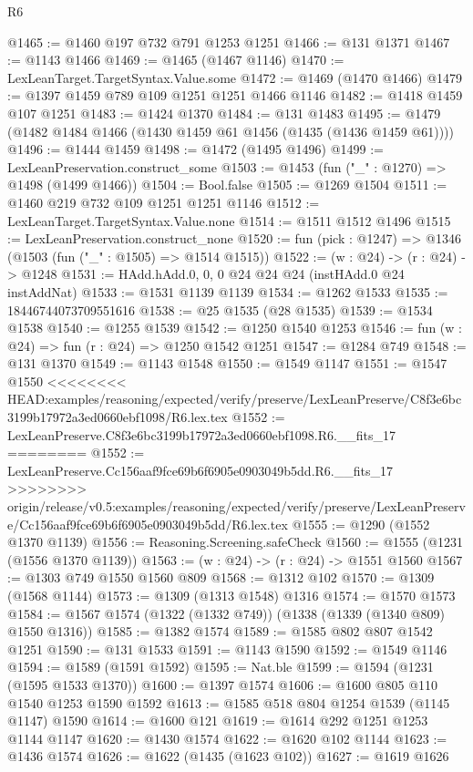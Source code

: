 \begin{lexlean}{R6}
\begin{coremodule}
{{{{{{{{{{{{{{{{{{{{{{{{{{{{{{{{{{{{{{{{{{{{{{{{{{{{{{{{{{{{{@1465 := @1460 @197 @732 @791 @1253 @1251
@1466 := @131 @1371
@1467 := @1143 @1466
@1469 := @1465 (@1467 @1146)
@1470 := LexLeanTarget.TargetSyntax.Value.some
@1472 := @1469 (@1470 @1466)
@1479 := @1397 @1459 @789 @109 @1251 @1251 @1466 @1146
@1482 := @1418 @1459 @107 @1251
@1483 := @1424 @1370
@1484 := @131 @1483
@1495 := @1479 (@1482 @1484 @1466 (@1430 @1459 @61 @1456 (@1435 (@1436 @1459 @61))))
@1496 := @1444 @1459
@1498 := @1472 (@1495 @1496)
@1499 := LexLeanPreservation.construct_some
@1503 := @1453 (fun ("_" : @1270) => @1498 (@1499 @1466))
@1504 := Bool.false
@1505 := @1269 @1504
@1511 := @1460 @219 @732 @109 @1251 @1251 @1146
@1512 := LexLeanTarget.TargetSyntax.Value.none
@1514 := @1511 @1512 @1496
@1515 := LexLeanPreservation.construct_none
@1520 := fun (pick : @1247) => @1346 (@1503 (fun ("_" : @1505) => @1514 @1515))
@1522 := (w : @24) -> (r : @24) -> @1248
@1531 := HAdd.hAdd.{0, 0, 0} @24 @24 @24 (instHAdd.{0} @24 instAddNat)
@1533 := @1531 @1139 @1139
@1534 := @1262 @1533
@1535 := 18446744073709551616
@1538 := @25 @1535 (@28 @1535)
@1539 := @1534 @1538
@1540 := @1255 @1539
@1542 := @1250 @1540 @1253
@1546 := fun (w : @24) => fun (r : @24) => @1250 @1542 @1251
@1547 := @1284 @749
@1548 := @131 @1370
@1549 := @1143 @1548
@1550 := @1549 @1147
@1551 := @1547 @1550
<<<<<<<< HEAD:examples/reasoning/expected/verify/preserve/LexLeanPreserve/C8f3e6bc3199b17972a3ed0660ebf1098/R6.lex.tex
@1552 := LexLeanPreserve.C8f3e6bc3199b17972a3ed0660ebf1098.R6.__fits_17
========
@1552 := LexLeanPreserve.Cc156aaf9fce69b6f6905e0903049b5dd.R6.__fits_17
>>>>>>>> origin/release/v0.5:examples/reasoning/expected/verify/preserve/LexLeanPreserve/Cc156aaf9fce69b6f6905e0903049b5dd/R6.lex.tex
@1555 := @1290 (@1552 @1370 @1139)
@1556 := Reasoning.Screening.safeCheck
@1560 := @1555 (@1231 (@1556 @1370 @1139))
@1563 := (w : @24) -> (r : @24) -> @1551 @1560
@1567 := @1303 @749 @1550 @1560 @809
@1568 := @1312 @102
@1570 := @1309 (@1568 @1144)
@1573 := @1309 (@1313 @1548) @1316
@1574 := @1570 @1573
@1584 := @1567 @1574 (@1322 (@1332 @749)) (@1338 (@1339 (@1340 @809) @1550 @1316))
@1585 := @1382 @1574
@1589 := @1585 @802 @807 @1542 @1251
@1590 := @131 @1533
@1591 := @1143 @1590
@1592 := @1549 @1146
@1594 := @1589 (@1591 @1592)
@1595 := Nat.ble
@1599 := @1594 (@1231 (@1595 @1533 @1370))
@1600 := @1397 @1574
@1606 := @1600 @805 @110 @1540 @1253 @1590 @1592
@1613 := @1585 @518 @804 @1254 @1539 (@1145 @1147) @1590
@1614 := @1600 @121
@1619 := @1614 @292 @1251 @1253 @1144 @1147
@1620 := @1430 @1574
@1622 := @1620 @102 @1144
@1623 := @1436 @1574
@1626 := @1622 (@1435 (@1623 @102))
@1627 := @1619 @1626
}}}}}}}}}}}}}}}}}}}}}}}}}}}}}}}}}}}}}}}}}}}}}}}}}}}}}}}}}}}}}
\end{coremodule}
\end{lexlean}
